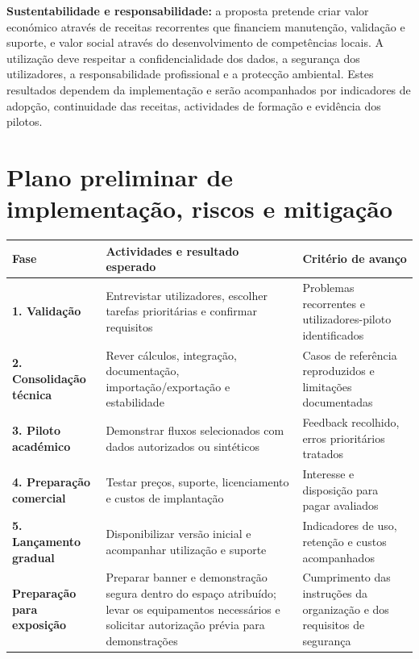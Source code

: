 \documentclass[11pt,a4paper]{article}
\begin{document}
\textbf{Sustentabilidade e responsabilidade:} a proposta pretende criar valor
económico através de receitas recorrentes que financiem manutenção, validação e
suporte, e valor social através do desenvolvimento de competências locais. A
utilização deve respeitar a confidencialidade dos dados, a segurança dos utilizadores,
a responsabilidade profissional e a protecção ambiental. Estes resultados dependem
da implementação e serão acompanhados por indicadores de adopção, continuidade das
receitas, actividades de formação e evidência dos pilotos.

\section{Plano preliminar de implementação, riscos e mitigação}

\begin{tabularx}{\textwidth}{>{\bfseries}p{2.5cm} X X}
  \toprule
  Fase & Actividades e resultado esperado & Critério de avanço \\
  \midrule
  1. Validação
    & Entrevistar utilizadores, escolher tarefas prioritárias e confirmar requisitos
    & Problemas recorrentes e utilizadores-piloto identificados \\
  2. Consolidação técnica
    & Rever cálculos, integração, documentação, importação/exportação e estabilidade
    & Casos de referência reproduzidos e limitações documentadas \\
  3. Piloto académico
    & Demonstrar fluxos selecionados com dados autorizados ou sintéticos
    & Feedback recolhido, erros prioritários tratados \\
  4. Preparação comercial
    & Testar preços, suporte, licenciamento e custos de implantação
    & Interesse e disposição para pagar avaliados \\
  5. Lançamento gradual
    & Disponibilizar versão inicial e acompanhar utilização e suporte
    & Indicadores de uso, retenção e custos acompanhados \\
  Preparação para exposição
    & Preparar banner e demonstração segura dentro do espaço atribuído; levar os
    equipamentos necessários e solicitar autorização prévia para demonstrações
    & Cumprimento das instruções da organização e dos requisitos de segurança \\
  \bottomrule
\end{tabularx}
\end{document}
